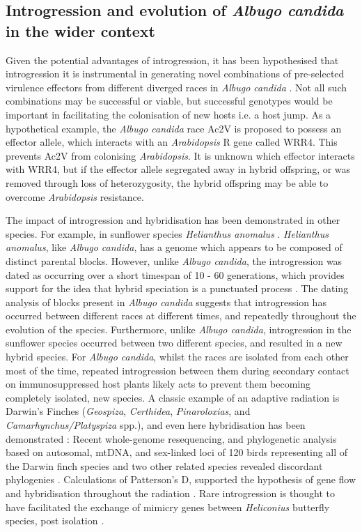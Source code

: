 \subsection{Introgression and evolution of \textit{Albugo candida} in the wider context}

Given the potential advantages of introgression, it has been hypothesised that introgression it is instrumental in generating novel combinations of pre-selected virulence effectors from different diverged races in \textit{Albugo candida} \parencite{McMullan2015a}. Not all such combinations may be successful or viable, but successful genotypes would be important in facilitating the colonisation of new hosts i.e. a host jump. As a hypothetical example, the \textit{Albugo candida} race Ac2V is proposed to possess an effector allele, which interacts with an \textit{Arabidopsis} R gene called WRR4. This prevents Ac2V from colonising \textit{Arabidopsis}. It is unknown which effector interacts with WRR4, but if the effector allele segregated away in hybrid offspring, or was removed through loss of heterozygosity, the hybrid offspring may be able to overcome \textit{Arabidopsis} resistance.

The impact of introgression and hybridisation has been demonstrated in other species. For example, in sunflower species \textit{Helianthus anomalus} \parencite{Ungerer1998RapidSunflowers.}. \textit{Helianthus anomalus}, like \textit{Albugo candida}, has a genome which appears to be composed of distinct parental blocks. However, unlike \textit{Albugo candida}, the introgression was dated as occurring over a short timespan of 10 - 60 generations, which provides support for the idea that hybrid speciation is a punctuated process \parencite{Ungerer1998RapidSunflowers.}⁠. The dating analysis of blocks present in \textit{Albugo candida} suggests that introgression has occurred between different races at different times, and repeatedly throughout the evolution of the species. Furthermore, unlike \textit{Albugo candida}, introgression in the sunflower species occurred between two different species, and resulted in a new hybrid species. For \textit{Albugo candida}, whilst the races are isolated from each other most of the time, repeated introgression between them during secondary contact on immunosuppressed host plants likely acts to prevent them becoming completely isolated, new species. A classic example of an adaptive radiation is Darwin's Finches (\textit{Geospiza}, \textit{Certhidea}, \textit{Pinaroloxias}, and \textit{Camarhynchus/Platyspiza} spp.), and even here hybridisation has been demonstrated \parencite{Lamichhaney2015}: Recent whole-genome resequencing, and phylogenetic analysis based on autosomal, mtDNA, and sex-linked loci of 120 birds representing all of the Darwin finch species and two other related species revealed discordant phylogenies \parencite{Lamichhaney2015}⁠. Calculations of Patterson's D, supported the hypothesis of gene flow and hybridisation throughout the radiation \parencite{Lamichhaney2015}⁠. Rare introgression is thought to have facilitated the exchange of mimicry genes between \textit{Heliconius} butterfly species, post isolation \parencite{Martin2013}.

